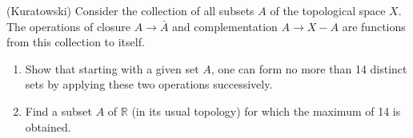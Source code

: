   \begin{exercise}[Munkres 17.21]
    (Kuratowski) Consider the collection of all subsets $A$ of the topological space $X$. The operations of closure $A \to \bar{A}$ and complementation $A \to X - A$ are functions from this collection to itself.
    \begin{enumerate}
      \item Show that starting with a given set $A$, one can form no more than 14 distinct sets by applying these two operations successively.
      \item Find a subset $A$ of $\mathbb{R}$ (in its usual topology) for which the maximum of 14 is obtained.
    \end{enumerate}
  \end{exercise}
  \begin{solution}
    
  \end{solution}

